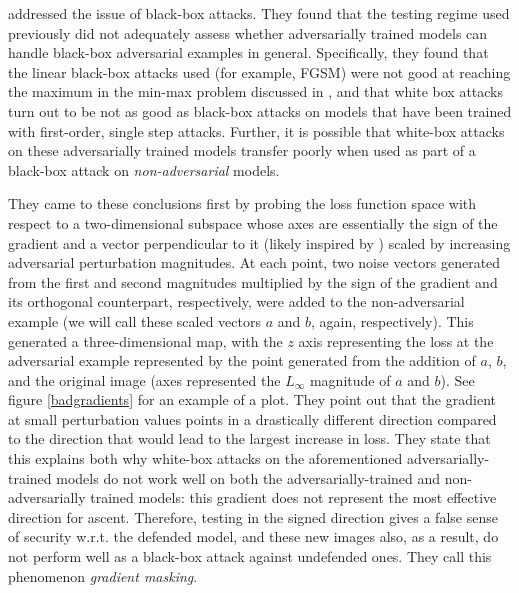\cite{tramèr2020ensemble} addressed the issue of black-box attacks. They found that the testing
regime used previously did not adequately assess whether adversarially trained models can handle
black-box adversarial examples in general. Specifically, they found that the linear black-box
attacks used (for example, FGSM\cite{goodfellow2015explaining}) were not good at reaching the
maximum in the min-max problem discussed in \cite{madry2019deep}, and that white box attacks turn
out to be not as good as black-box attacks on models that have been trained with first-order, single
step attacks. Further, it is possible that white-box attacks on these adversarially trained models
transfer poorly when used as part of a black-box attack on \textit{non-adversarial} models.

They came to these conclusions first by probing the loss function space with respect to a
two-dimensional subspace whose axes are essentially the sign of the gradient and a vector
perpendicular to it (likely inspired by \cite{goodfellow2015explaining}) scaled by increasing
adversarial perturbation magnitudes. At each point, two noise vectors generated from the first and
second magnitudes multiplied by the sign of the gradient and its orthogonal counterpart,
respectively, were added to the non-adversarial example (we will call these scaled vectors $a$ and
$b$, again, respectively). This generated a three-dimensional map, with the $z$ axis representing
the loss at the adversarial example represented by the point generated from the addition of $a$,
$b$, and the original image (axes represented the $L_{\infty}$ magnitude of $a$ and $b$). See figure
\ref{badgradients} for an example of a plot. They point out that the gradient at small perturbation values
points in a drastically different direction compared to the direction that would lead to the largest
increase in loss. They state that this explains both why white-box attacks on the aforementioned
adversarially-trained models do not work well on both the adversarially-trained and
non-adversarially trained models: this gradient does not represent the most effective direction for
ascent. Therefore, testing in the signed direction gives a false sense of security w.r.t. the
defended model, and these new images also, as a result, do not perform well as a black-box attack
against undefended ones. They call this phenomenon \textit{gradient masking}.
